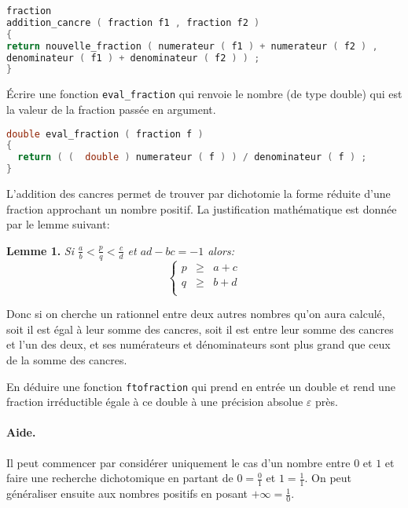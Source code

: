 \begin{solutioncachee}
  \begin{lstlisting}[language=C]
fraction
addition_cancre ( fraction f1 , fraction f2 )
{
return nouvelle_fraction ( numerateur ( f1 ) + numerateur ( f2 ) ,
denominateur ( f1 ) + denominateur ( f2 ) ) ;
}
\end{lstlisting}
\end{solutioncachee}

\question Écrire une fonction \texttt{eval\_fraction} qui renvoie le
nombre (de type double) qui est la valeur de la fraction passée en
argument.
\begin{solutioncachee}
  \begin{lstlisting}[language=C]
double eval_fraction ( fraction f ) 
{ 
  return ( (  double ) numerateur ( f ) ) / denominateur ( f ) ; 
}
\end{lstlisting}
\end{solutioncachee}


L’addition des cancres permet de trouver par dichotomie la forme réduite d’une fraction
approchant un nombre positif. La justification mathématique est donnée par le lemme suivant:
\begin{trivlist}
\item \textbf{Lemme 1.} \em
Si \(\frac ab < \frac pq < \frac cd\) et \(ad-bc = -1\) alors:
\[
  \left\lbrace
    \begin{array}{rcl}
      p&\ge&a+c\\
      q&\ge&b+d\\
    \end{array}
  \right.
\]
\end{trivlist}

Donc si on cherche un rationnel entre deux autres nombres qu’on aura calculé, soit il est
égal à leur somme des cancres, soit il est entre leur somme des cancres et l’un des deux, et ses
numérateurs et dénominateurs sont plus grand que ceux de la somme des cancres.


\question En déduire une fonction \texttt{ftofraction} qui prend en
entrée un double et rend une fraction irréductible égale à ce double à
une précision absolue \(\varepsilon\) près.  
\paragraph{Aide.} Il peut commencer par considérer uniquement
le cas d’un nombre entre \(0\) et \(1\)  et faire une recherche
dichotomique en partant de \(0 = \frac 01\) et \(1 = \frac 11\). On peut généraliser ensuite aux nombres positifs en posant \(+\infty=\frac 10\).  
